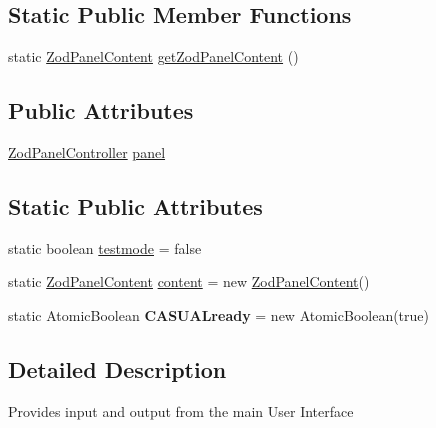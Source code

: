 \subsection*{Static Public Member Functions}
\begin{DoxyCompactItemize}
\item 
static \hyperlink{classcom_1_1casual__dev_1_1zodui_1_1contentpanel_1_1_zod_panel_content}{Zod\-Panel\-Content} \hyperlink{classcom_1_1casual__dev_1_1zodui_1_1_c_a_s_u_a_l_zod_main_u_i_a79c252683203d9962ef6758444aa2896}{get\-Zod\-Panel\-Content} ()
\end{DoxyCompactItemize}
\subsection*{Public Attributes}
\begin{DoxyCompactItemize}
\item 
\hyperlink{classcom_1_1casual__dev_1_1zodui_1_1contentpanel_1_1_zod_panel_controller}{Zod\-Panel\-Controller} \hyperlink{classcom_1_1casual__dev_1_1zodui_1_1_c_a_s_u_a_l_zod_main_u_i_ad415d8420f386b81ca76e507033c1dc4}{panel}
\end{DoxyCompactItemize}
\subsection*{Static Public Attributes}
\begin{DoxyCompactItemize}
\item 
static boolean \hyperlink{classcom_1_1casual__dev_1_1zodui_1_1_c_a_s_u_a_l_zod_main_u_i_aac679df84fcf6f2de09324adc88450c3}{testmode} = false
\item 
static \hyperlink{classcom_1_1casual__dev_1_1zodui_1_1contentpanel_1_1_zod_panel_content}{Zod\-Panel\-Content} \hyperlink{classcom_1_1casual__dev_1_1zodui_1_1_c_a_s_u_a_l_zod_main_u_i_a5580e1b051bd203106d03dfe39e5d944}{content} = new \hyperlink{classcom_1_1casual__dev_1_1zodui_1_1contentpanel_1_1_zod_panel_content}{Zod\-Panel\-Content}()
\item 
\hypertarget{classcom_1_1casual__dev_1_1zodui_1_1_c_a_s_u_a_l_zod_main_u_i_a71cc4d8847f333ffd0621b70da95e3c5}{static Atomic\-Boolean {\bfseries C\-A\-S\-U\-A\-Lready} = new Atomic\-Boolean(true)}\label{classcom_1_1casual__dev_1_1zodui_1_1_c_a_s_u_a_l_zod_main_u_i_a71cc4d8847f333ffd0621b70da95e3c5}

\end{DoxyCompactItemize}


\subsection{Detailed Description}
Provides input and output from the main User Interface

